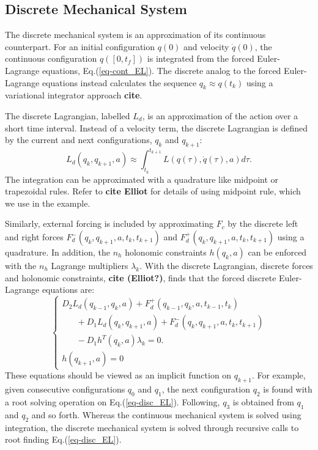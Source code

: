 \documentclass[letterpaper, 10pt, conference]{ieeeconf}
\begin{document}
\subsection{Discrete Mechanical System}
The discrete mechanical system is an approximation of its continuous counterpart.  For an initial configuration $q(0)$ and velocity $\dot{q}(0)$, the continuous configuration $q([0,t_f])$ is integrated from the forced Euler-Lagrange equations, Eq.(\ref{eq-cont_EL}).  The discrete analog to the forced Euler-Lagrange equations instead calculates the sequence $q_k\approx q(t_k)$ using a variational integrator approach \textbf{cite}.  

The discrete Lagrangian, labelled $L_d$, is an approximation of the action over a short time interval.  Instead of a velocity term, the discrete Lagrangian is defined by the current and next configurations, $q_k$ and $q_{k+1}$:
\begin{equation}
L_d(q_k,q_{k+1},a) \approx \int_{t_k}^{t_{k+1}}L(q(\tau),\dot{q}(\tau),a)d\tau.
\label{eq-Ld}
\end{equation}
The integration can be approximated with a quadrature like midpoint or trapezoidal rules.  Refer to \textbf{cite Elliot} for details of using midpoint rule, which we use in the example.  

Similarly, external forcing is included by approximating $F_c$ by the discrete left and right forces $F_d^-(q_k,q_{k+1},a,t_k,t_{k+1})$ and $F_d^+(q_k,q_{k+1},a,t_k,t_{k+1})$ using a quadrature.  In addition, the $n_h$ holonomic constraints $h(q_k,a)$ can be enforced with the $n_h$ Lagrange multipliers $\lambda_k$.  With the discrete Lagrangian, discrete forces and holonomic constraints, \textbf{cite (Elliot?)}, finds that the forced discrete Euler-Lagrange equations are:
\begin{equation}
\left\{\begin{array}{l}
D_2 L_d(q_{k-1},q_{k},a) + F_d^+(q_{k-1},q_{k},a,t_{k-1},t_{k}) \\\hspace{20pt}+ D_1L_d(q_k,q_{k+1},a) + F_d^-(q_k,q_{k+1},a,t_k,t_{k+1}) \\\hspace{20pt} - D_1h^T(q_k,a)\lambda_k= 0. \\
\hspace{0pt}h(q_{k+1},a) = 0
\end{array}
\right.
\label{eq-disc_EL}
\end{equation}
These equations should be viewed as an implicit function on $q_{k+1}$.  For example, given consecutive configurations $q_0$ and $q_1$, the next configuration $q_2$ is found with a root solving operation on Eq.(\ref{eq-disc_EL}). Following, $q_3$ is obtained from $q_1$ and $q_2$ and so forth.  Whereas the continuous mechanical system is solved using integration, the discrete mechanical system is solved through recursive calls to root finding Eq.(\ref{eq-disc_EL}). 
\end{document}
